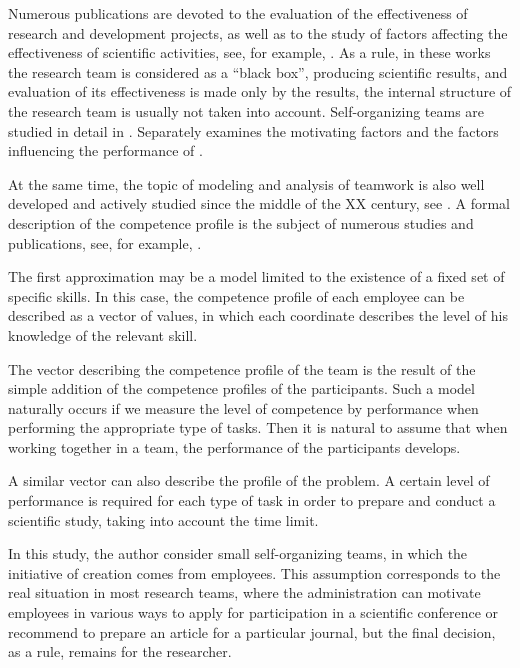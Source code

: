 \documentclass[12pt]{report}
\theoremstyle{definition}
\begin{document}
Numerous publications are devoted to the evaluation of the effectiveness of research and development projects, as well as to the study of factors affecting the effectiveness of scientific activities, see, for example, \cite{shcherb1982, ovch2009,fursov2016,shmatko2017}.
As a rule, in these works the research team is considered as a ``black box'', producing scientific results, and evaluation of its effectiveness is made only by the results, the internal structure of the research team is usually not taken into account. 
Self-organizing teams are studied in detail in \cite{moe2008understanding}.  
Separately examines the motivating factors \cite{shmatko2017} and the factors influencing the performance of \cite{fursov2016}.

At the same time, the topic of modeling and analysis of teamwork is also well developed and actively studied since the middle of the XX century, see \cite{bavelas1948mathematical,nov2008, bei2014}. 
A formal description of the competence profile is the subject of numerous studies and publications, see, for example, \cite{rozewski2009competence,bei2014}.

The first approximation may be a model limited to the existence of a fixed set of specific skills. 
In this case, the competence profile of each employee can be described as a vector of values, in which each coordinate describes the level of his knowledge of the relevant skill.

The vector describing the competence profile of the team is the result of the simple addition of the competence profiles of the participants. 
Such a model naturally occurs if we measure the level of competence by performance when performing the appropriate type of tasks. 
Then it is natural to assume that when working together in a team, the performance of the participants develops.

A similar vector can also describe the profile of the problem.
A certain level of performance is required for each type of task in order to prepare and conduct a scientific study, taking into account the time limit.

In this study, the author consider small self-organizing teams, in which the initiative of creation comes from employees. 
This assumption corresponds to the real situation in most research teams, where the administration can motivate employees in various ways to apply for participation in a scientific conference or recommend to prepare an article for a particular journal, but the final decision, as a rule, remains for the researcher.
\end{document}
